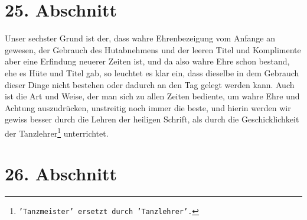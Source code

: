 \section{25. Abschnitt} \label{kap9_ab25}

Unser sechster Grund ist der, dass wahre Ehrenbezeigung vom Anfange an gewesen,
der Gebrauch des Hutabnehmens und der leeren Titel und Komplimente aber eine
Erfindung neuerer Zeiten ist, und da also wahre Ehre schon bestand, ehe es Hüte
und Titel gab, so leuchtet es klar ein, dass dieselbe in dem Gebrauch dieser
Dinge nicht bestehen oder dadurch an den Tag gelegt werden kann. Auch ist die
Art und Weise, der man sich zu allen Zeiten bediente, um wahre Ehre und Achtung
auszudrücken, unstreitig noch immer die beste, und hierin werden wir gewiss
besser durch die Lehren der heiligen Schrift, als durch die Geschicklichkeit der
Tanzlehrer\footnote{\texttt{'Tanzmeister' ersetzt durch
'Tanzlehrer'.}} unterrichtet.

\section{26. Abschnitt} \label{kap9_ab26}

